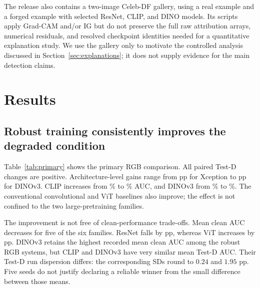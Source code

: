 \documentclass[conference,10pt,letterpaper]{IEEEtran}
\begin{document}
The release also contains a two-image Celeb-DF gallery, using a real example and a forged example with selected ResNet, CLIP, and DINO models. Its scripts apply Grad-CAM and/or IG but do not preserve the full raw attribution arrays, numerical residuals, and resolved checkpoint identities needed for a quantitative explanation study. We use the gallery only to motivate the controlled analysis discussed in Section~\ref{sec:explanations}; it does not supply evidence for the main detection claims.

\section{Results}
\subsection{Robust training consistently improves the degraded condition}
\label{sec:robustresults}
Table~\ref{tab:primary} shows the primary RGB comparison. All \PositiveDegradationPairs{} paired Test-D changes are positive. Architecture-level gains range from \MinDegradationGain{} pp for Xception to \MaxDegradationGain{} pp for DINOv3. CLIP increases from \ClipDegradedStandard{}\% to \ClipDegradedRobust{}\% AUC, and DINOv3 from \DinoDegradedStandard{}\% to \DinoDegradedRobust{}\%. The conventional convolutional and ViT baselines also improve; the effect is not confined to the two large-pretraining families.

\begin{table}[t]
\caption{Primary seed-matched RGB comparison on MFFI. Each AUC cell is mean $\pm$ sample SD over $\mathcal S=\{7,42,123,2024,2025\}$. The last column summarizes the five within-seed robust-minus-standard differences. Values are recomputed from released per-seed records; SD is not a population confidence interval.}
\label{tab:primary}
\centering
\small
\setlength{\tabcolsep}{7pt}

\end{table}

The improvement is not free of clean-performance trade-offs. Mean clean AUC decreases for five of the six families. ResNet falls by \ResnetCleanGainAbs{} pp, whereas ViT increases by \VitCleanGain{} pp. DINOv3 retains the highest recorded mean clean AUC among the robust RGB systems, but CLIP and DINOv3 have very similar mean Test-D AUC. Their Test-D run dispersion differs: the corresponding SDs round to $0.24$ and $1.95$ pp. Five seeds do not justify declaring a reliable winner from the small difference between those means.
\end{document}
